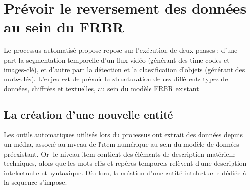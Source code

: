 \section{\label{II_3_A}Prévoir le reversement des données au sein du \gls{FRBR}} 

Le processus automatisé proposé repose sur l'exécution de deux phases : d'une part la segmentation temporelle d'un flux vidéo (générant des time-codes et images-clé), et d'autre part la détection et la classification d'objets (générant des mots-clés). L'enjeu est de prévoir la structuration de ces différents types de données, chiffrées et textuelles, au sein du modèle \gls{FRBR} existant. 


\subsection{La création d'une nouvelle entité}

Les outils automatiques utilisés lors du processus ont extrait des données depuis un média, associé au niveau de l'\gls{item} numérique au sein du modèle de données préexistant. Or, le niveau \gls{item} contient des éléments de description matérielle techniques, alors que les mots-clés et repères temporels relèvent d'une description intelectuelle et syntaxique. Dès lors, la création d'une entité intelectuelle dédiée à la \gls{sequence} s'impose. 

